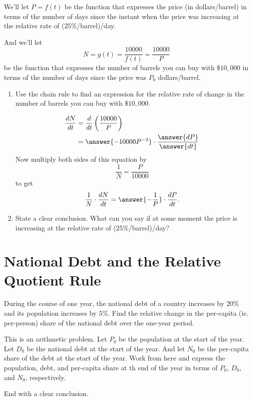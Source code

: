 \documentclass{ximera}
\begin{document}
\begin{question}
\begin{enumerate}
We'll let $P=f(t)$ be the function that expresses the price (in dollars/barrel) in terms of the number of days since the instant when the price was increasing at the relative rate of ($25\%$/barrel)/day.

And we'll let 
\[
    N = g(t) = \frac{10000}{f(t)} = \frac{10000}{P}
\]
be the function that expresses the number of barrels you can buy with $\$10,000$ in terms of the number of days since the price was $P_0$ dollars/barrel.

\begin{enumerate}

\item Use the chain rule to find an expression for the relative rate of change in the number of barrels you can buy with $\$10,000$.

\begin{align*}
 \frac{dN}{dt} &= \frac{d}{dt} \left(   \frac{10000}{P} \right) \\
                      &= \answer{-10000P^{-2}}\cdot \frac{\answer{dP}}{\answer{dt}} 
\end{align*}
Now multiply both sides of this equation by 
\[
  \frac{1}{N} = \frac{P}{10000}
\]
to get
\[
     \frac{1}{N} \cdot \frac{dN}{dt} = \answer{-\frac{1}{P}} \cdot \frac{dP}{dt} .
\]

\item State a clear conclusion. What can you say if at some moment the price is increasing at the relative rate of ($25\%$/barrel)/day?

\begin{freeResponse}
\end{freeResponse}

\end{enumerate}
\end{enumerate}
\end{question}

\section{National Debt and the Relative Quotient Rule}

\begin{question} \label{Qmfm122190}
During the course of one year, the national debt of a country increases by $20\%$ and its population increases by $5\%$. Find the relative change in the per-capita (ie. per-person) share of the national debt over the one-year period.

This is an arithmetic problem. Let $P_0$ be the population at the start of the year. Let $D_0$ be the national debt at the start of the year. And let $N_0$ be the per-capita share of the debt at the start of the year. Work from here and express the population, debt, and per-capita share at th end of the year in terms of $P_0$, $D_0$, and $N_0$, respectively.

End with a clear conclusion.
\begin{freeResponse}
\end{freeResponse}
\end{question}
\end{document}
